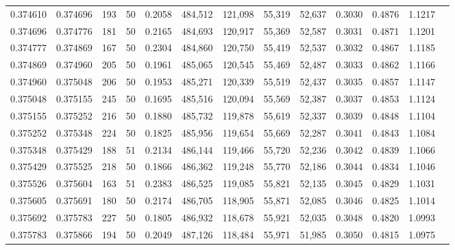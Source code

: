 \begin{tabular}{rrrrrrrrrrrrr}
0.374610 & 0.374696 &   193 &  50 &                                     0.2058 & 484,512 & 121,098 &  55,319 &  52,637 & 0.3030 & 0.4876 & 1.1217 \\
0.374696 & 0.374776 &   181 &  50 &                                     0.2165 & 484,693 & 120,917 &  55,369 &  52,587 & 0.3031 & 0.4871 & 1.1201 \\
0.374777 & 0.374869 &   167 &  50 &                                     0.2304 & 484,860 & 120,750 &  55,419 &  52,537 & 0.3032 & 0.4867 & 1.1185 \\
0.374869 & 0.374960 &   205 &  50 &                                     0.1961 & 485,065 & 120,545 &  55,469 &  52,487 & 0.3033 & 0.4862 & 1.1166 \\
0.374960 & 0.375048 &   206 &  50 &                                     0.1953 & 485,271 & 120,339 &  55,519 &  52,437 & 0.3035 & 0.4857 & 1.1147 \\
0.375048 & 0.375155 &   245 &  50 &                                     0.1695 & 485,516 & 120,094 &  55,569 &  52,387 & 0.3037 & 0.4853 & 1.1124 \\
0.375155 & 0.375252 &   216 &  50 &                                     0.1880 & 485,732 & 119,878 &  55,619 &  52,337 & 0.3039 & 0.4848 & 1.1104 \\
0.375252 & 0.375348 &   224 &  50 &                                     0.1825 & 485,956 & 119,654 &  55,669 &  52,287 & 0.3041 & 0.4843 & 1.1084 \\
0.375348 & 0.375429 &   188 &  51 &                                     0.2134 & 486,144 & 119,466 &  55,720 &  52,236 & 0.3042 & 0.4839 & 1.1066 \\
0.375429 & 0.375525 &   218 &  50 &                                     0.1866 & 486,362 & 119,248 &  55,770 &  52,186 & 0.3044 & 0.4834 & 1.1046 \\
0.375526 & 0.375604 &   163 &  51 &                                     0.2383 & 486,525 & 119,085 &  55,821 &  52,135 & 0.3045 & 0.4829 & 1.1031 \\
0.375605 & 0.375691 &   180 &  50 &                                     0.2174 & 486,705 & 118,905 &  55,871 &  52,085 & 0.3046 & 0.4825 & 1.1014 \\
0.375692 & 0.375783 &   227 &  50 &                                     0.1805 & 486,932 & 118,678 &  55,921 &  52,035 & 0.3048 & 0.4820 & 1.0993 \\
0.375783 & 0.375866 &   194 &  50 &                                     0.2049 & 487,126 & 118,484 &  55,971 &  51,985 & 0.3050 & 0.4815 & 1.0975 \\

\end{tabular}
